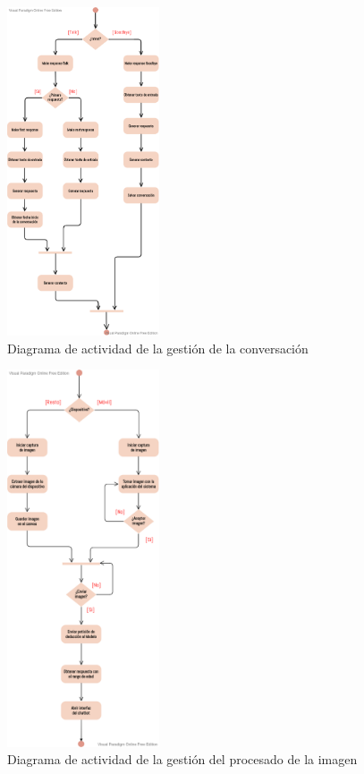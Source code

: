 \begin{figure}[h]
\centering
\includegraphics[width=0.4\textwidth]{imagenes/06_Diseno/diagram_acti_make_conver.png}
\caption{Diagrama de actividad de la gestión de la conversación}
\label{fig:diagram_acti_make_conver}
\end{figure}

\begin{figure}[h]
\centering
\includegraphics[width=0.4\textwidth]{imagenes/06_Diseno/diagram_acti_proce_imagen.png}
\caption{Diagrama de actividad de la gestión del procesado de la imagen}
\label{fig:diagram_acti_proce_imagen}
\end{figure}

